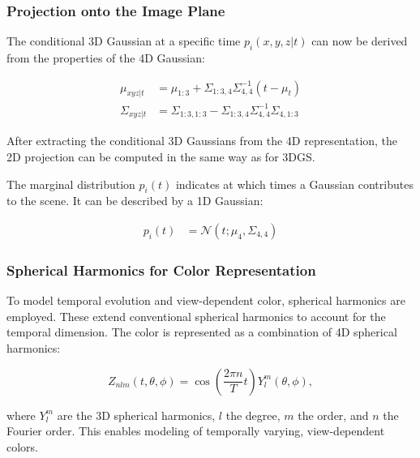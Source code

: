 \subsubsection{Projection onto the Image Plane}

The conditional 3D Gaussian at a specific time \(p_i(x,y,z|t)\) can now be derived from the properties of the 4D Gaussian:

\begin{align}
\mu_{xyz|t} &= \mu_{1:3} + \Sigma_{1:3,4} \Sigma_{4,4}^{-1} (t - \mu_t) \\
\Sigma_{xyz|t} &= \Sigma_{1:3,1:3} - \Sigma_{1:3,4} \Sigma_{4,4}^{-1} \Sigma_{4,1:3}
\end{align}

After extracting the conditional 3D Gaussians from the 4D representation, the 2D projection can be computed in the same way as for 3DGS.

The marginal distribution \(p_i(t)\) indicates at which times a Gaussian contributes to the scene. 
It can be described by a 1D Gaussian:

\begin{align}
p_i(t) &= \mathcal{N}(t; \mu_4, \Sigma_{4,4})
\end{align}

\subsubsection{Spherical Harmonics for Color Representation}

To model temporal evolution and view-dependent color, spherical harmonics are employed. 
These extend conventional spherical harmonics to account for the temporal dimension. 
The color is represented as a combination of 4D spherical harmonics:

\[
Z_{nlm}(t, \theta, \phi) = \cos\left(\frac{2\pi n}{T} t\right) Y_l^m(\theta, \phi),
\]

where \(Y_l^m\) are the 3D spherical harmonics, \(l\) the degree, \(m\) the order, and \(n\) the Fourier order. 
This enables modeling of temporally varying, view-dependent colors.






